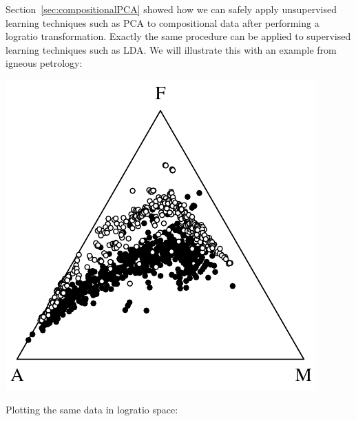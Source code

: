 Section~\ref{sec:compositionalPCA} showed how we can safely apply
unsupervised learning techniques such as PCA to compositional data
after performing a logratio transformation. Exactly the same procedure
can be applied to supervised learning techniques such as LDA. We will
illustrate this with an example from igneous petrology:

\noindent\begin{minipage}[t][][b]{.35\textwidth}
\includegraphics[width=\textwidth]{../figures/AFM.pdf}\medskip
\end{minipage}
\begin{minipage}[t][][t]{.65\textwidth}
  \label{fig:AFM}
\end{minipage}

Plotting the same data in logratio space:

